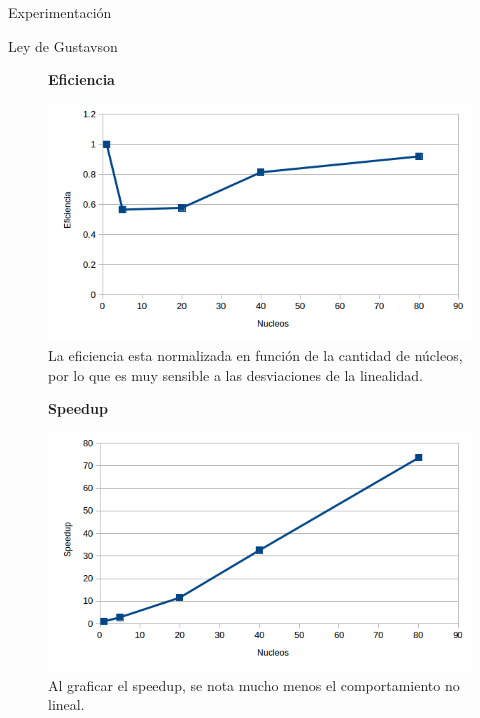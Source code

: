 \begin{section}{Experimentación}
\begin{subsection}{Ley de Gustavson}
\begin{figure}
    \textbf{Eficiencia}\par\medskip

\includegraphics[width=.75\textwidth,height=.75\textheight,keepaspectratio]{figures/exp_gustafson_eficiency}
\caption{La eficiencia esta normalizada en función de la cantidad de núcleos, por lo que es muy sensible a las desviaciones de la linealidad.}
\label{fig:exp_gustafson_eficiency}
\end{figure}


\begin{figure}
\textbf{Speedup}\par\medskip
\includegraphics[width=.75\textwidth,height=.75\textheight,keepaspectratio]{figures/exp_gustafson_speedup}
\caption{Al graficar el speedup, se nota mucho menos el comportamiento no lineal.}
\label{fig:exp_gustafson_speedup}
\end{figure}

\end{subsection}
\end{section}
